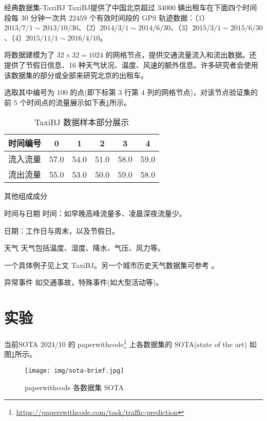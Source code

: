 \documentclass{libs/format}
\begin{document}
\begin{frame}{经典数据集-TaxiBJ}
  TaxiBJ\cite{T-51}提供了中国北京超过 $34000$ 辆出租车在下面四个时间段每 $30$ 分钟一次共 $22459$ 个有效时间段的 GPS 轨迹数据：（1）$2013/7/1\sim2013/10/30$、（2）$2014/3/1\sim2014/6/30$、（3）$2015/3/1\sim2015/6/30$、（4）$2015/11/1\sim2016/4/10$。
  
  将数据建模为了 $32\times32=1024$ 的网格节点，提供交通流量流入和流出数据。还提供了节假日信息、16 种天气状况、温度、风速的额外信息。许多研究者会使用该数据集的部分或全部来研究北京的出租车。

  选取其中编号为 $100$ 的点(即下标第 $3$ 行第 $4$ 列的网格节点)，对该节点验证集的前 $5$ 个时间点的流量展示如下表\ref{table:taxibj}所示。

  \begin{table}[]  
    \centering\caption{TaxiBJ 数据样本部分展示}\label{table:taxibj}
    \begin{tabular}{|c|c|c|c|c|c|}  
    \hline  
    时间编号 & 0 & 1 & 2 & 3 & 4 \\ \hline  
    流入流量 & 57.0 & 54.0 & 51.0 & 58.0 & 59.0 \\ \hline  
    流出流量 & 55.0 & 53.0 & 50.0 & 59.0 & 58.0 \\ \hline  
    \end{tabular}  
  \end{table}
\end{frame}

  

\begin{frame}{其他组成成分}
  \begin{block}{时间与日期}
    时间：如早晚高峰流量多、凌晨深夜流量少。

    日期：工作日与周末，以及节假日。
  \end{block}
  \begin{block}{天气}
    天气包括温度、湿度、降水、气压、风力等。\cite{T-ZS2}

    一个具体例子见上文 TaxiBJ\cite{T-51}。另一个城市历史天气数据集可参考 \cite{T-70}。
  \end{block}
  \begin{block}{异常事件}
    如交通事故，特殊事件(如大型活动等)。
  \end{block}
\end{frame}

\section{实验}
\begin{frame}{当前SOTA}
  2024/10 的 paperwithcode\footnote{\url{https://paperswithcode.com/task/traffic-prediction}} 上各数据集的 SOTA(state of the art) 如图\ref{fig:sota-brief}所示。

  \begin{figure}
    \centering
    \texttt{[image: img/sota-brief.jpg]}
    \caption{paperwithcode 各数据集 SOTA}\label{fig:sota-brief}
  \end{figure}
\end{frame}
\end{document}
